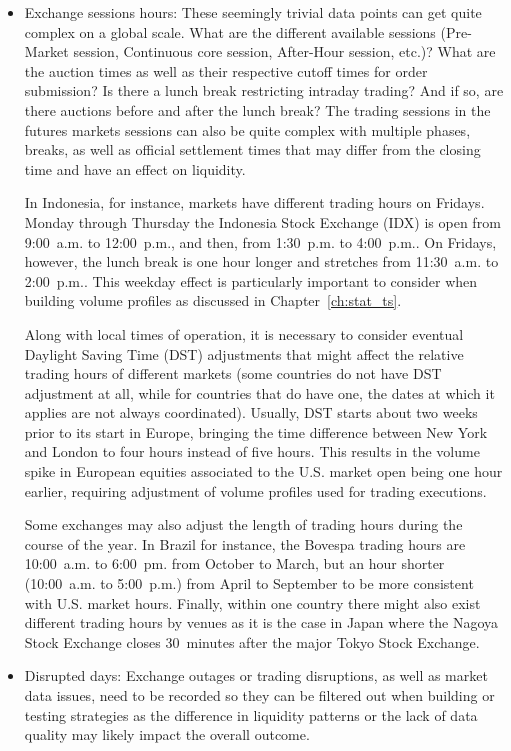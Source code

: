 \begin{itemize}
\begin{itemize}
\item Exchange sessions hours: These seemingly trivial data points can get quite complex on a global scale. What are the different available sessions (Pre-Market session, Continuous core session, After-Hour session, etc.)? What are the auction times as well as their respective cutoff times for order submission? Is there a lunch break restricting intraday trading? And if so, are there auctions before and after the lunch break?  The trading sessions in the futures markets sessions can also be quite complex with multiple phases, breaks, as well as official settlement times that may differ from the closing time and have an effect on liquidity.

In Indonesia, for instance, markets have different trading hours on Fridays. Monday through Thursday the Indonesia Stock Exchange (IDX) is open from 9:00~a.m. to 12:00~p.m., and then, from 1:30~p.m. to 4:00~p.m.. On Fridays, however, the lunch break is one hour longer and stretches from 11:30~a.m. to 2:00~p.m.. This weekday effect is particularly important to consider when building volume profiles as discussed in Chapter~\ref{ch:stat_ts}.

Along with local times of operation, it is necessary to consider eventual Daylight Saving Time (DST) adjustments that might affect the relative trading hours of different markets (some countries do not have DST adjustment at all, while for countries that do have one, the dates at which it applies are not always coordinated). Usually, DST starts about two weeks prior to its start in Europe, bringing the time difference between New York and London to four hours instead of five hours. This results in the volume spike in European equities associated to the U.S. market open being one hour earlier, requiring adjustment of volume profiles used for trading executions.

Some exchanges may also adjust the length of trading hours during the course of the year. In Brazil for instance, the Bovespa trading hours are 10:00~a.m. to 6:00~pm. from October to March, but an hour shorter (10:00~a.m. to 5:00~p.m.) from April to September to be more consistent with U.S. market hours. Finally, within one country there might also exist different trading hours by venues as it is the case in Japan where the Nagoya Stock Exchange closes 30~minutes after the major Tokyo Stock Exchange.

\item Disrupted days: Exchange outages or trading disruptions, as well as market data issues, need to be recorded so they can be filtered out when building or testing strategies as the difference in liquidity patterns or the lack of data quality may likely impact the overall outcome.
\end{itemize}



\end{itemize}
